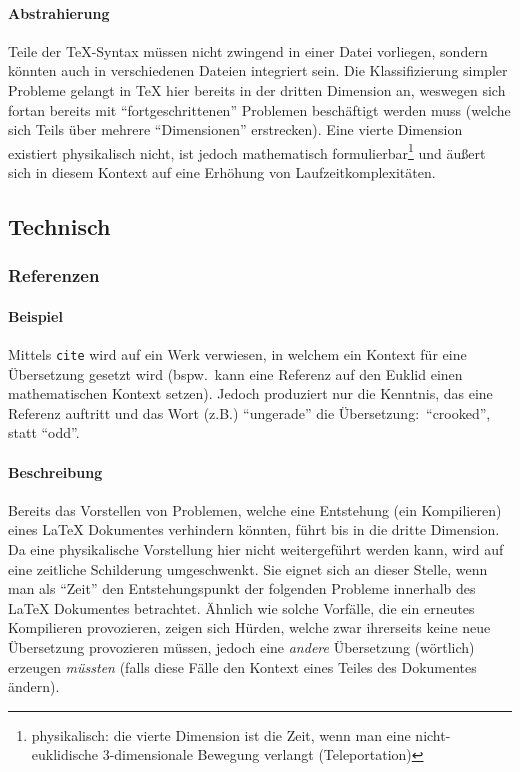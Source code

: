\paragraph*{Abstrahierung}%
Teile der \TeX-Syntax müssen nicht zwingend in einer Datei vorliegen, sondern könnten auch in verschiedenen Dateien integriert sein. Die Klassifizierung simpler Probleme gelangt in \TeX{} hier bereits in der dritten Dimension an, weswegen sich fortan bereits mit \enquote{fortgeschrittenen} Problemen beschäftigt werden muss (welche sich Teils über mehrere \enquote{Dimensionen} erstrecken). Eine vierte Dimension existiert physikalisch nicht, ist jedoch mathematisch formulierbar\footnote{physikalisch: die vierte Dimension ist die Zeit, wenn man eine nicht-euklidische 3-dimensionale Bewegung verlangt (Teleportation)} und äußert sich in diesem Kontext auf eine Erhöhung von Laufzeitkomplexitäten.





\subsection{Technisch}\label{problems:advanced}
\subsubsection{Referenzen}
\paragraph*{Beispiel}%
Mittels \texttt{cite} wird auf ein Werk verwiesen, in welchem ein Kontext für eine Übersetzung gesetzt wird (bspw.\ kann eine Referenz auf den Euklid einen mathematischen Kontext setzen). Jedoch produziert nur die Kenntnis, das eine Referenz auftritt und das Wort (z.B.) \enquote{ungerade} die Übersetzung:\ \enquote{crooked}, statt \enquote{odd}.
\paragraph*{Beschreibung}
Bereits das Vorstellen von Problemen, welche eine Entstehung (ein Kompilieren) eines \LaTeX{} Dokumentes verhindern könnten, führt bis in die dritte Dimension. Da eine physikalische Vorstellung hier nicht weitergeführt werden kann, wird auf eine zeitliche Schilderung umgeschwenkt. Sie eignet sich an dieser Stelle, wenn man als \enquote{Zeit} den Entstehungspunkt der folgenden Probleme innerhalb des \LaTeX{} Dokumentes betrachtet. Ähnlich wie solche Vorfälle, die ein erneutes Kompilieren provozieren, zeigen sich Hürden, welche zwar ihrerseits keine neue Übersetzung provozieren müssen, jedoch eine \textit{andere} Übersetzung (wörtlich) erzeugen \textit{müssten} (falls diese Fälle den Kontext eines Teiles des Dokumentes ändern).%


